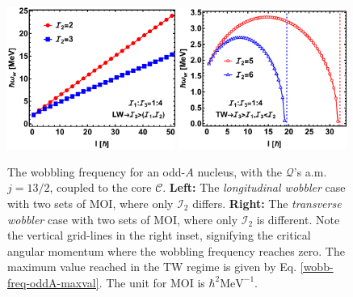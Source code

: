 \begin{figure}
    \centering
    \includegraphics[width=0.49\textwidth]{Chapters/Figures/wobb_freq_oddA-LW.pdf}
    \includegraphics[width=0.49\textwidth]{Chapters/Figures/wobb_freq_oddA-TW.pdf}
    \caption{The wobbling frequency for an odd-$A$ nucleus, with the $\mathcal{Q}$'s a.m. $j=13/2$, coupled to the core $\mathscr{C}$. \textbf{Left:} The \emph{longitudinal wobbler} case with two sets of MOI, where only $\mathcal{I}_2$ differs. \textbf{Right:} The \emph{transverse wobbler} case with two sets of MOI, where only $\mathcal{I}_2$ is different. Note the vertical grid-lines in the right inset, signifying the critical angular momentum where the wobbling frequency reaches zero. The maximum value reached in the TW regime is given by Eq. \ref{wobb-freq-oddA-maxval}. The unit for MOI is $\hbar^2\text{MeV}^{-1}$.}
    \label{wobbling-freq-oddA}
\end{figure}

